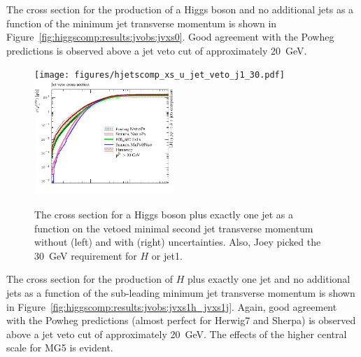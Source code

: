 The cross section for the production of a Higgs boson and no
additional jets as a function of the minimum jet transverse momentum
is shown in Figure~\ref{fig:higgscomp:results:jvobs:jvxs0}. Good
agreement with the Powheg predictions is observed above a jet veto cut
of approximately 20~GeV.

\begin{figure}[t!]
  \centering
  \texttt{[image: figures/hjetscomp\_xs\_u\_jet\_veto\_j1\_30.pdf]}
  \hfill
  \includegraphics[width=0.47\textwidth]{figures/hjetscomp_xs_jet_veto_j1_30.pdf}
  \caption{
    The cross
    section for a Higgs boson plus exactly one jet as a function on
    the vetoed minimal second jet transverse momentum without
    (left) and with (right) uncertainties. Also, Joey picked the
    30~GeV requirement for $H$ or jet1.
    \label{fig:higgscomp:results:jvobs:jvxs1j}
  }
\end{figure}

The cross section for the production of $H$ plus exactly one jet and
no additional jets as a function of the sub-leading minimum jet
transverse momentum is shown in
Figure~\ref{fig:higgscomp:results:jvobs:jvxs1h_jvxs1j}. Again, good
agreement with the Powheg predictions (almost perfect for Herwig7 and
Sherpa) is observed above a jet veto cut of approximately 20~GeV. The
effects of the higher central scale for MG5 is evident.


